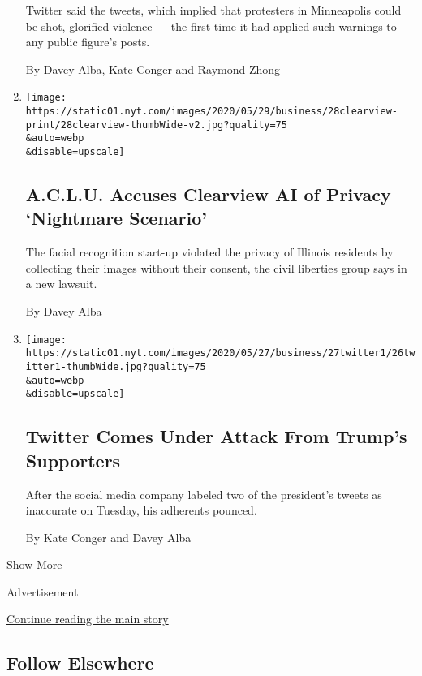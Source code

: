 \begin{enumerate}
  Twitter said the tweets, which implied that protesters in Minneapolis
  could be shot, glorified violence --- the first time it had applied
  such warnings to any public figure's posts.

  By Davey Alba, Kate Conger and Raymond Zhong
\item
  \href{/2020/05/28/technology/clearview-ai-privacy-lawsuit.html}{}

  \texttt{[image: https://static01.nyt.com/images/2020/05/29/business/28clearview-print/28clearview-thumbWide-v2.jpg?quality=75\\\&auto=webp\\\&disable=upscale]}

  \hypertarget{aclu-accuses-clearview-ai-of-privacy-nightmare-scenario}{%
  \subsection{A.C.L.U. Accuses Clearview AI of Privacy `Nightmare
  Scenario'}\label{aclu-accuses-clearview-ai-of-privacy-nightmare-scenario}}

  The facial recognition start-up violated the privacy of Illinois
  residents by collecting their images without their consent, the civil
  liberties group says in a new lawsuit.

  By Davey Alba
\item
  \href{/2020/05/27/technology/trump-twitter.html}{}

  \texttt{[image: https://static01.nyt.com/images/2020/05/27/business/27twitter1/26twitter1-thumbWide.jpg?quality=75\\\&auto=webp\\\&disable=upscale]}

  \hypertarget{twitter-comes-under-attack-from-trumps-supporters}{%
  \subsection{Twitter Comes Under Attack From Trump's
  Supporters}\label{twitter-comes-under-attack-from-trumps-supporters}}

  After the social media company labeled two of the president's tweets
  as inaccurate on Tuesday, his adherents pounced.

  By Kate Conger and Davey Alba
\end{enumerate}

Show More

Advertisement

\protect\hyperlink{after-mid2}{Continue reading the main story}

\hypertarget{follow-elsewhere}{%
\subsection{Follow Elsewhere}\label{follow-elsewhere}}

